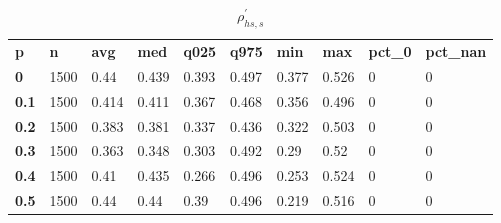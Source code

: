 \begin{table}[h]
 \centering 
\footnotesize
\caption{$\rho_{hs,s}^\prime $}
\label{tab:alphahss}
\begin{tabular}[h]{| l l l l l l l l l l|
    } \hline
\textbf{ p} & \textbf{ n} & \textbf{ avg} & \textbf{ med} & \textbf{ q025} & \textbf{ q975} & \textbf{ min} & \textbf{ max} & \textbf{ pct\_0} & \textbf{ pct\_nan}
           \\
  \textbf{  0} & 1500 &  0.44 & 0.439 & 0.393 & 0.497 & 0.377 & 0.526 & 0 & 0
           \\
  \textbf{0.1} & 1500 & 0.414 & 0.411 & 0.367 & 0.468 & 0.356 & 0.496 & 0 & 0
           \\
  \textbf{0.2} & 1500 & 0.383 & 0.381 & 0.337 & 0.436 & 0.322 & 0.503 & 0 & 0
           \\
  \textbf{0.3} & 1500 & 0.363 & 0.348 & 0.303 & 0.492 &  0.29 &  0.52 & 0 & 0
           \\
  \textbf{0.4} & 1500 &  0.41 & 0.435 & 0.266 & 0.496 & 0.253 & 0.524 & 0 & 0
           \\
  \textbf{0.5} & 1500 &  0.44 &  0.44 &  0.39 & 0.496 & 0.219 & 0.516 & 0 & 0
           \\
 \hline \end{tabular}
 \end{table}
